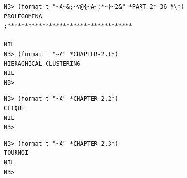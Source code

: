 \documentclass{article}
\begin{document}
\begin{lstlisting}[language=sectitle]
N3> (format t "~A~&;~v@{~A~:*~}~2&" *PART-2* 36 #\*)
PROLEGOMENA
;************************************

NIL
N3> (format t "~A" *CHAPTER-2.1*)
HIERACHICAL CLUSTERING
NIL
N3> 
\end{lstlisting}
{}

\bigskip

\bigskip
\bigskip

\begin{lstlisting}[language=sectitle]
N3> (format t "~A" *CHAPTER-2.2*)
CLIQUE
NIL
N3> 
\end{lstlisting}

\bigskip

\bigskip
\bigskip

\begin{lstlisting}[language=sectitle]
N3> (format t "~A" *CHAPTER-2.3*)
TOURNOI
NIL
N3> 
\end{lstlisting}

\bigskip

\bigskip
\bigskip
\end{document}
